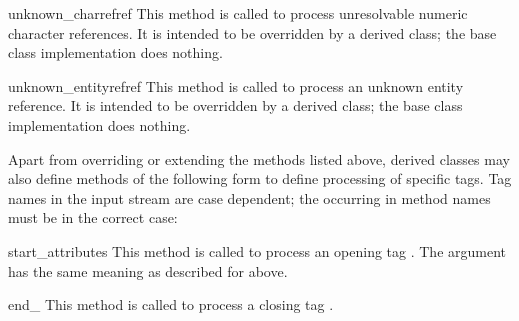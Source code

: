 \begin{funcdesc}{unknown_charref}{ref}
This method is called to process unresolvable numeric character
references.  It is intended to be overridden by a derived class; the
base class implementation does nothing.
\end{funcdesc}

\begin{funcdesc}{unknown_entityref}{ref}
This method is called to process an unknown entity reference.  It is
intended to be overridden by a derived class; the base class
implementation does nothing.
\end{funcdesc}

Apart from overriding or extending the methods listed above, derived
classes may also define methods of the following form to define
processing of specific tags.  Tag names in the input stream are case
dependent; the  occurring in method names must be in the
correct case:

\begin{funcdesc}{start_}{attributes}
This method is called to process an opening tag .  The
 argument has the same meaning as described for
 above.
\end{funcdesc}

\begin{funcdesc}{end_}{}
This method is called to process a closing tag .
\end{funcdesc}
